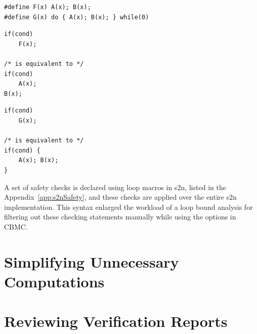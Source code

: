 \begin{table}[h]
\begin{verbatim}
#define F(x) A(x); B(x);
#define G(x) do { A(x); B(x); } while(0)
\end{verbatim}

\centering
\begin{minipage}[t]{.4\textwidth}
\centering
\begin{verbatim}
if(cond)
    F(x);

/* is equivalent to */
if(cond)
    A(x);
B(x);
\end{verbatim}
\end{minipage}\hfill
\begin{minipage}[t]{.5\textwidth}
\centering
\begin{verbatim}
if(cond)
    G(x);

/* is equivalent to */
if(cond) {
    A(x); B(x);
}
\end{verbatim}
\end{minipage}
\hfill
{}
\end{table}

A set of safety checks is declared using  loop macros in s2n, listed in the Appendix~\ref{app:s2nSafety}, and these checks are applied over the entire s2n implementation. This syntax enlarged the workload of a loop bound analysis for filtering out these checking statements manually while using the  options in CBMC.






\section{Simplifying Unnecessary Computations}
\label{sec:suc}

\section{Reviewing Verification Reports}